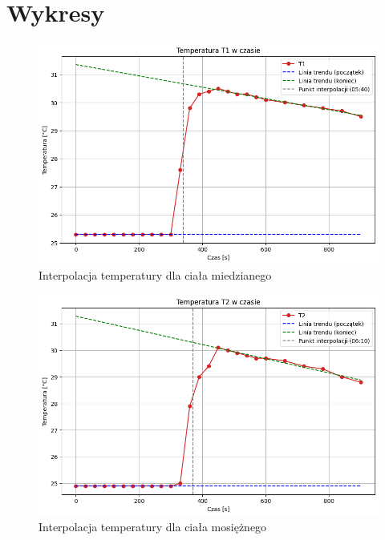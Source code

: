 \documentclass[a4paper,12pt]{article}
\begin{document}

\newpage
\section{Wykresy}

\begin{figure}[H]
    \centering
    \includegraphics[width=0.9\textheight,angle=90]{t1_interpolacja.png}
    \caption{Interpolacja temperatury dla ciała miedzianego}
    \label{fig:t1_interpolacja}
\end{figure}

\newpage
\begin{figure}[H]
    \centering
    \includegraphics[width=0.9\textheight,angle=90]{t2_interpolacja.png}
    \caption{Interpolacja temperatury dla ciała mosiężnego}
    \label{fig:t2_interpolacja}
\end{figure}
\end{document}
